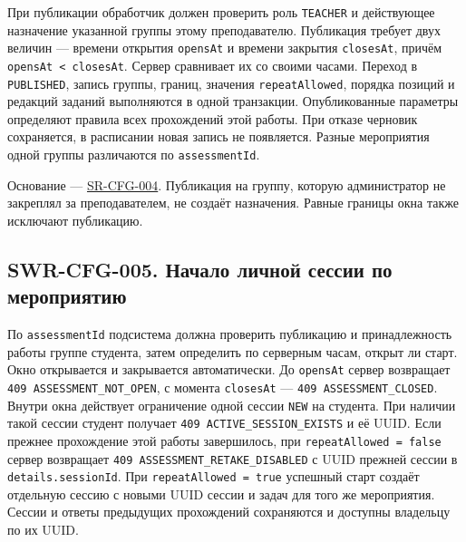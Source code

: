 \documentclass[12pt,a4paper]{article}
\begin{document}
\hypertarget{swr-cfg-004}{}

При публикации обработчик должен проверить роль \texttt{TEACHER} и действующее назначение указанной группы этому преподавателю. Публикация требует двух величин --- времени открытия \texttt{opensAt} и времени закрытия \texttt{closesAt}, причём \texttt{opens\allowbreak{}At < closes\allowbreak{}At}. Сервер сравнивает их со своими часами. Переход в \texttt{PUBLISHED}, запись группы, границ, значения \texttt{repeat\allowbreak{}Allowed}, порядка позиций и редакций заданий выполняются в одной транзакции. Опубликованные параметры определяют правила всех прохождений этой работы. При отказе черновик сохраняется, в расписании новая запись не появляется. Разные мероприятия одной группы различаются по \texttt{assessment\allowbreak{}Id}.

Основание --- {\href{../04\_Системные\_требования/DOC-05\_Системные\_требования.pdf\#sr-cfg-004}{SR-CFG-004}}. Публикация на группу, которую администратор не закреплял за преподавателем, не создаёт назначения. Равные границы окна также исключают публикацию.

\subsection{SWR-CFG-005. Начало личной сессии по мероприятию}\label{swr-cfg-005-ux43dux430ux447ux430ux43bux43e-ux43bux438ux447ux43dux43eux439-ux441ux435ux441ux441ux438ux438-ux43fux43e-ux43cux435ux440ux43eux43fux440ux438ux44fux442ux438ux44e}

\hypertarget{swr-cfg-005-начало-личной-сессии-по-мероприятию}{}

\hypertarget{swr-cfg-005}{}

По \texttt{assessment\allowbreak{}Id} подсистема должна проверить публикацию и принадлежность работы группе студента, затем определить по серверным часам, открыт ли старт. Окно открывается и закрывается автоматически. До \texttt{opensAt} сервер возвращает \texttt{409 ASSESSMENT\_\allowbreak{}NOT\_\allowbreak{}OPEN}, с момента \texttt{closesAt} --- \texttt{409 ASSESSMENT\_\allowbreak{}CLOSED}. Внутри окна действует ограничение одной сессии \texttt{NEW} на студента. При наличии такой сессии студент получает \texttt{409 ACTIVE\_\allowbreak{}SESSION\_\allowbreak{}EXISTS} и её UUID. Если прежнее прохождение этой работы завершилось, при \texttt{repeat\allowbreak{}Allowed =\allowbreak{} false} сервер возвращает \texttt{409 ASSESSMENT\_\allowbreak{}RETAKE\_\allowbreak{}DISABLED} с UUID прежней сессии в \texttt{details.\allowbreak{}session\allowbreak{}Id}. При \texttt{repeat\allowbreak{}Allowed =\allowbreak{} true} успешный старт создаёт отдельную сессию с новыми UUID сессии и задач для того же мероприятия. Сессии и ответы предыдущих прохождений сохраняются и доступны владельцу по их UUID.
\end{document}
